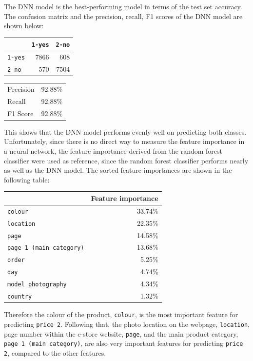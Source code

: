 \documentclass[12pt,twoside,a4paper]{article}
\begin{document}
The DNN model is the best-performing model in terms of the test set accuracy. The confusion matrix and the precision, recall, F1 scores of the DNN model are shown below:

\begin{center}
\begin{multicols}{2}
\begin{tabular}{lrr}
\toprule
{} & \texttt{1-yes} & \texttt{2-no} \\ 
\midrule
\texttt{1-yes} & 7866 & 608 \\ 
\texttt{2-no} & 570 & 7504 \\ 
\bottomrule
\end{tabular} 

\begin{tabular}{lr}
\toprule
Precision & 92.88\% \\
Recall & 92.88\% \\ 
F1 Score & 92.88\% \\ 
\bottomrule
\end{tabular}
\end{multicols}
\end{center}

This shows that the DNN model performs evenly well on predicting both classes. Unfortunately, since there is no direct way to measure the feature importance in a neural network, the feature importance derived from the random forest classifier were used as reference, since the random forest classifier performs nearly as well as the DNN model. The sorted feature importances are shown in the following table:

\begin{center}
\begin{tabular}{lr}
\toprule
{} & Feature importance \\ 
\midrule
\texttt{colour} & 33.74\% \\
\texttt{location} & 22.35\% \\
\texttt{page} & 14.58\% \\
\texttt{page 1 (main category)} & 13.68\% \\
\texttt{order} & 5.25\% \\
\texttt{day} & 4.74\% \\
\texttt{model photography} & 4.34\% \\
\texttt{country} & 1.32\% \\
\bottomrule
\end{tabular} 
\end{center}

Therefore the colour of the product, \texttt{colour}, is the most important feature for predicting \texttt{price 2}. Following that, the photo location on the webpage, \texttt{location}, page number within the e-store website, \texttt{page}, and the main product category, \texttt{page 1 (main category)}, are also very important features for predicting \texttt{price 2}, compared to the other features.
\end{document}
